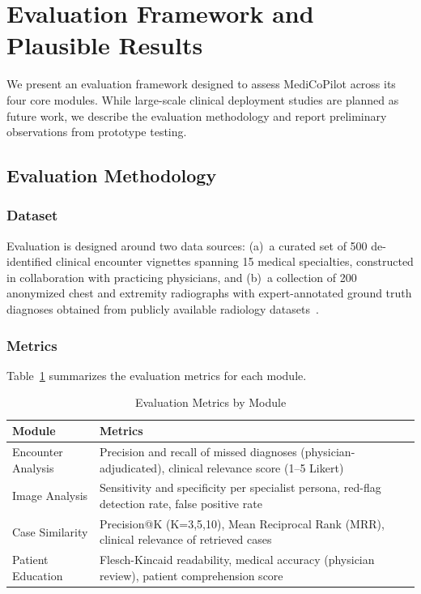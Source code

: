 \documentclass[conference]{IEEEtran}
\begin{document}
\section{Evaluation Framework and Plausible Results}
\label{sec:evaluation}

We present an evaluation framework designed to assess MediCoPilot across its four core modules. While large-scale clinical deployment studies are planned as future work, we describe the evaluation methodology and report preliminary observations from prototype testing.

\subsection{Evaluation Methodology}

\subsubsection{Dataset}
Evaluation is designed around two data sources: (a)~a curated set of 500 de-identified clinical encounter vignettes spanning 15 medical specialties, constructed in collaboration with practicing physicians, and (b)~a collection of 200 anonymized chest and extremity radiographs with expert-annotated ground truth diagnoses obtained from publicly available radiology datasets~\cite{b16}.

\subsubsection{Metrics}
Table~\ref{tab:metrics} summarizes the evaluation metrics for each module.

\begin{table}[htbp]
\caption{Evaluation Metrics by Module}
\begin{center}
\begin{tabular}{p{1.8cm}p{6cm}}
\toprule
\textbf{Module} & \textbf{Metrics} \\
\midrule
Encounter Analysis & Precision and recall of missed diagnoses (physician-adjudicated), clinical relevance score (1--5 Likert) \\
\midrule
Image Analysis & Sensitivity and specificity per specialist persona, red-flag detection rate, false positive rate \\
\midrule
Case Similarity & Precision@K (K=3,5,10), Mean Reciprocal Rank (MRR), clinical relevance of retrieved cases \\
\midrule
Patient Education & Flesch-Kincaid readability, medical accuracy (physician review), patient comprehension score \\
\bottomrule
\end{tabular}
\label{tab:metrics}
\end{center}
\end{table}
\end{document}
